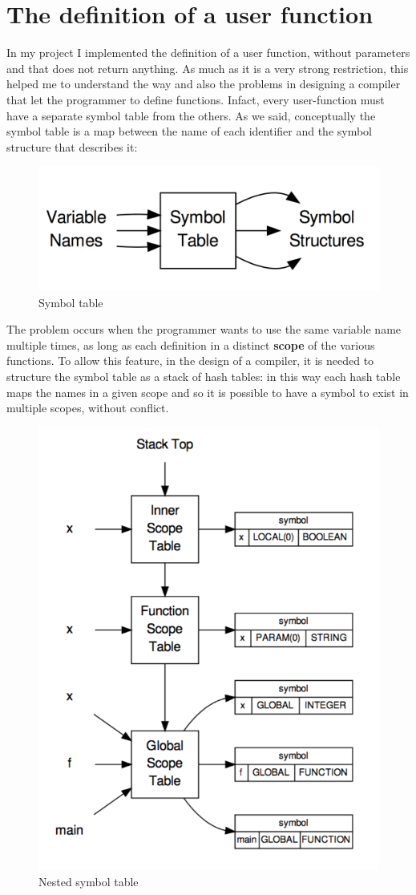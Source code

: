 \documentclass[a4paper,12pt,,titlepage,openright]{report}
\begin{document}
\section{The definition of a user function}
In my project I implemented the definition of a user function, without parameters and that does not return anything. As much as it is a very strong restriction, this helped me to understand the way and also the problems in designing a compiler that let the programmer to define functions. 
Infact, every user-function must have a separate symbol table from the others.
As we said, conceptually the symbol table is a map between the name of each identifier and the symbol structure that describes it:
\newpage
\begin{figure}[htbp]
\centering
\includegraphics[width=.6\textwidth]{symboltable.png}
\caption{Symbol table}
\end{figure}
The problem occurs when the programmer wants to use the same variable name multiple times, as long as each definition in a distinct \textbf{scope} of the various functions.
To allow this feature, in the design of a compiler, it is needed to structure the symbol table as a stack of hash tables: in this way each hash table maps the names in a given scope and so it is possible to have a symbol to exist in multiple scopes, without conflict.
\begin{figure}[htbp]
\centering
\includegraphics[width=.5\textwidth]{nestedsymbol.png}
\caption{Nested symbol table}
\end{figure}
\end{document}
